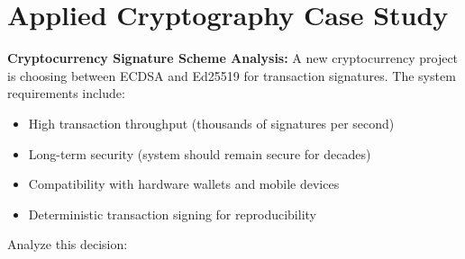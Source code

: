 \documentclass[10pt,a4paper,american]{exam}
\begin{document}
\section{Applied Cryptography Case Study}
\begin{questions}
	\question[20] \textbf{Cryptocurrency Signature Scheme Analysis:}
	A new cryptocurrency project is choosing between ECDSA and Ed25519 for transaction signatures. The system requirements include:
	\begin{itemize}
		\item High transaction throughput (thousands of signatures per second)
		\item Long-term security (system should remain secure for decades)
		\item Compatibility with hardware wallets and mobile devices
		\item Deterministic transaction signing for reproducibility
	\end{itemize}
	Analyze this decision:
\end{questions}
\end{document}
